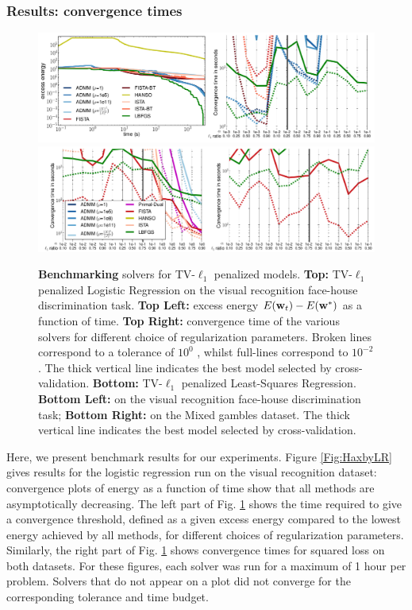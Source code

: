 \subsubsection{Results: convergence times}
 \begin{figure}[!htbp]
   \includegraphics[width=1\linewidth]{figures/solvers_1.png}
   \includegraphics[width=1\linewidth]{figures/solvers_2.png}
   \caption{\textbf{Benchmarking } solvers for TV-$\ell_1$ penalized models. \textbf{Top:} TV-$\ell_1$ penalized Logistic Regression on the visual recognition face-house discrimination task. \textbf{Top Left:} excess energy $E(\mathbf{w}_t ) - E(\mathbf{w}^*)$ as a function of time. \textbf{Top Right:} convergence time of the various solvers for different choice of regularization parameters. Broken lines correspond to a tolerance of
     $10^0$ , whilst full-lines correspond to $10^{-2}$ . The thick vertical line indicates the best model selected by cross-validation. \textbf{Bottom:} TV-$\ell_1$ penalized Least-Squares Regression. \textbf{Bottom Left:} on the visual recognition face-house discrimination task; \textbf{Bottom Right:} on the Mixed gambles dataset. The thick vertical line indicates the best model selected by cross-validation.}
   \label{fig:tvl1bench}
\end{figure}

\label{sec:results}
Here, we present benchmark results for our experiments. Figure
\ref{Fig:HaxbyLR} gives results for the logistic regression run on the
visual recognition dataset: convergence plots of energy as a function of
time show that all methods are asymptotically decreasing. The left part of
Fig. \ref{fig:tvl1bench}
shows the time required to give a convergence
threshold, defined as a given excess energy compared to the lowest energy
achieved by all methods, for different choices of regularization
parameters. Similarly, the right part of Fig. \ref{fig:tvl1bench} shows convergence times
for squared loss on both datasets. For these figures,
each solver was run for a maximum of 1 hour per problem. Solvers that do
not appear on a plot did not converge for the corresponding
tolerance and time budget.

